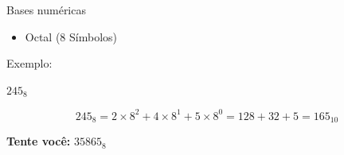 

\begin{frame}{Bases numéricas}
    \begin{itemize}
        \item Octal (8 Símbolos)
    \end{itemize}

    \vspace{0.5cm}

    Exemplo:

    \begin{center}
        $245_{8}$
    \end{center}

    \[
        245_{8}
        = 2 \times 8^{2}
        + 4 \times 8^{1}
        + 5 \times 8^{0}
        = 128 + 32 + 5
        = 165_{10}
    \]

    \vspace{0.5cm}

    \textbf{Tente você:} $35865_{8}$
\end{frame}